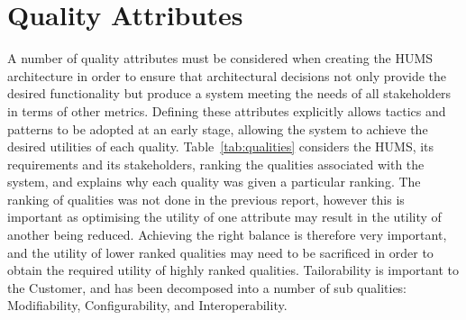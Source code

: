 \documentclass[10pt,a4paper]{article}
\begin{document}
\section{Quality Attributes}
\label{sec:qualities}
A number of quality attributes must be considered when creating the HUMS architecture in order to ensure that architectural decisions not only provide the desired functionality but produce a system meeting the needs of all stakeholders in terms of other metrics.
Defining these attributes explicitly allows tactics and patterns to be adopted at an early stage, allowing the system to achieve the desired utilities of each quality. 
Table~\ref{tab:qualities} considers the HUMS, its requirements and its stakeholders, ranking the qualities associated with the system, and explains why each quality was given a particular ranking. The ranking of qualities was not done in the previous report, however this is important as optimising the utility of one attribute may result in the utility of another being reduced. Achieving the right balance is therefore very important, and the utility of lower ranked qualities may need to be sacrificed in order to obtain the required utility of highly ranked qualities. Tailorability is important to the Customer, and has been decomposed into a number of sub qualities: Modifiability, Configurability, and Interoperability.
\end{document}
